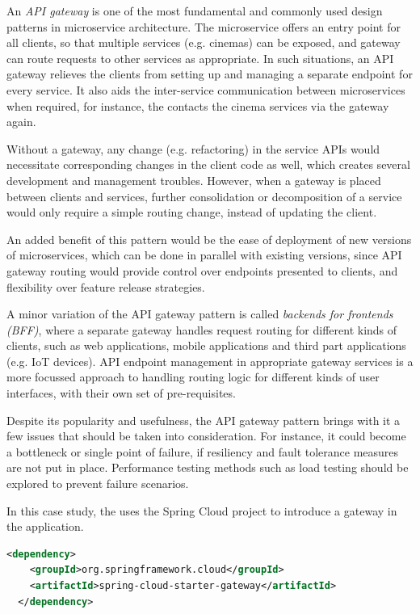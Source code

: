 An \textit{API gateway} is one of the most fundamental and commonly used design patterns in microservice architecture. The  microservice offers an entry point for all clients, so that multiple services (e.g. cinemas) can be exposed, and gateway can route requests to other services as appropriate. In such situations, an API gateway relieves the clients from setting up and managing a separate endpoint for every service. It also aids the inter-service communication between microservices when required, for instance, the  contacts the cinema services via the gateway again.

Without a gateway, any change (e.g. refactoring) in the service APIs would necessitate corresponding changes in the client code as well, which creates several development and management troubles. However, when a gateway is placed between clients and services, further consolidation or decomposition of a service would only require a simple routing change, instead of updating the client.

An added benefit of this pattern would be the ease of deployment of new versions of microservices, which can be done in parallel with existing versions, since API gateway routing would provide control over endpoints presented to clients, and flexibility over feature release strategies.

A minor variation of the API gateway pattern is called \textit{backends for frontends (BFF)}, where a separate gateway handles request routing for different kinds of clients, such as web applications, mobile applications and third part applications (e.g. IoT devices). API endpoint management in appropriate gateway services is a more focussed approach to handling routing logic for different kinds of user interfaces, with their own set of pre-requisites.

Despite its popularity and usefulness, the API gateway pattern brings with it a few issues that should be taken into consideration. For instance, it could become a bottleneck or single point of failure, if resiliency and fault tolerance measures are not put in place. Performance testing methods such as load testing should be explored to prevent failure scenarios.

In this case study, the  uses the Spring Cloud project to introduce a gateway in the application.

\begin{lstlisting}[language=XML, caption=Maven dependency for Spring Cloud Gateway]
  <dependency>
    <groupId>org.springframework.cloud</groupId>
    <artifactId>spring-cloud-starter-gateway</artifactId>
  </dependency>
\end{lstlisting}

